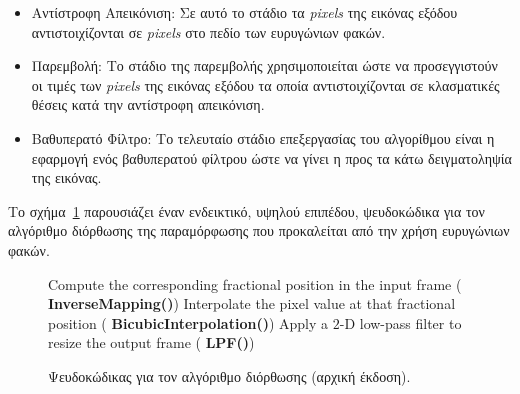 \begin{itemize}

\item{Αντίστροφη Απεικόνιση: Σε αυτό το στάδιο τα \textsl{pixels} της εικόνας εξόδου αντιστοιχίζονται σε \textsl{pixels} στο πεδίο των ευρυγώνιων φακών.}

\item{Παρεμβολή: Το στάδιο της παρεμβολής χρησιμοποιείται ώστε να προσεγγιστούν οι τιμές των \textsl{pixels} της εικόνας εξόδου τα οποία αντιστοιχίζονται σε κλασματικές θέσεις κατά την αντίστροφη απεικόνιση.}

\item{Βαθυπερατό Φίλτρο: Το τελευταίο στάδιο επεξεργασίας του αλγορίθμου είναι η εφαρμογή ενός βαθυπερατού φίλτρου ώστε να γίνει η προς τα κάτω δειγματοληψία της εικόνας.}

\end{itemize}
\indent
Το σχήμα~\ref{figure:fig26} παρουσιάζει έναν ενδεικτικό, υψηλού επιπέδου, ψευδοκώδικα για τον αλγόριθμο διόρθωσης της παραμόρφωσης που προκαλείται από την χρήση ευρυγώνιων φακών.
\begin{figure}
\centering
\begin{small}
\begin{algorithmic}[1]
\STATE {}
\STATE {}
\STATE Compute the corresponding fractional position in the input frame ({\textbf{ InverseMapping()}})
\STATE Interpolate the pixel value at that fractional position ({\textbf{ BicubicInterpolation()}})
\ENDFOR
\STATE Apply a $2$-D low-pass filter to resize the output frame ({\textbf{ LPF()}})
\ENDFOR
\end{algorithmic}
\end{small}
\caption{\label{figure:fig26} Ψευδοκώδικας για τον αλγόριθμο διόρθωσης (αρχική έκδοση).}
\end{figure}
